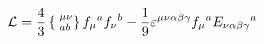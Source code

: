\begin{equation}
{\cal L} = \frac{4}{3} \left\{ \phantom{|}^{\mu\nu}_{ab} \right\}
f_\mu{}^a f_\nu{}^b - \frac{1}{9}
\varepsilon^{\mu\nu\alpha\beta\gamma} f_\mu{}^a
E_{\nu\alpha\beta\gamma}{}^a
\end{equation}


